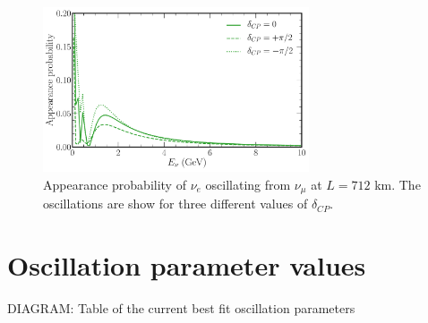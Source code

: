 \begin{figure} %
    \includegraphics[origin=c,width=0.7\textwidth]{diagrams/3-theory/explore_osc_cp_probs.pdf}
    \caption[$\nu_{e}$ appearance probability for different $\delta_{CP}$ values]
    {Appearance probability of $\nu_{e}$ oscillating from $\nu_{\mu}$ at $L=712$ km. The
        oscillations are show for three different values of $\delta_{CP}$.}
    \label{fig:osc_cp_probs}
\end{figure}

\section{Oscillation parameter values} %
\label{sec:theory_summary} %

DIAGRAM: Table of the current best fit oscillation parameters